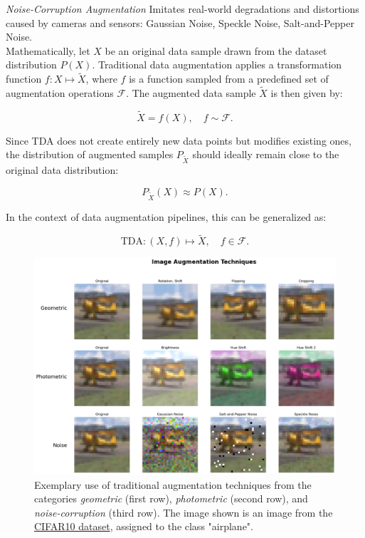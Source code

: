 \noindent\textit{Noise-Corruption Augmentation}
Imitates real-world degradations and distortions caused by cameras and sensors: Gaussian Noise, Speckle Noise, Salt-and-Pepper Noise.\\

Mathematically, let \( X \) be an original data sample drawn from the dataset distribution \( P(X) \). Traditional data augmentation applies a transformation function \( f: X \mapsto \tilde{X} \), where \( f \) is a function sampled from a predefined set of augmentation operations \( \mathcal{F} \). The augmented data sample \( \tilde{X} \) is then given by:

\[
\tilde{X} = f(X), \quad f \sim \mathcal{F}.
\]

Since TDA does not create entirely new data points but modifies existing ones, the distribution of augmented samples \( P_{\tilde{X}} \) should ideally remain close to the original data distribution:

\[
P_{\tilde{X}}(X) \approx P(X).
\]

In the context of data augmentation pipelines, this can be generalized as:

\[
\text{TDA}: (X, f) \mapsto \tilde{X}, \quad f \in \mathcal{F}.
\]

\begin{figure}[htbp]
    \centering
    \includegraphics[width=.9\textwidth]{abb/traditional_image_augmentation_examples.png}
    \caption{Exemplary use of traditional augmentation techniques from the categories \textit{geometric} (first row), \textit{photometric} (second row), and \textit{noise-corruption} (third row). The image shown is an image from the \hyperref[used_datasets]{CIFAR10 dataset}, assigned to the class "airplane".}
    \label{fig:figure_tda_examples}
\end{figure}

